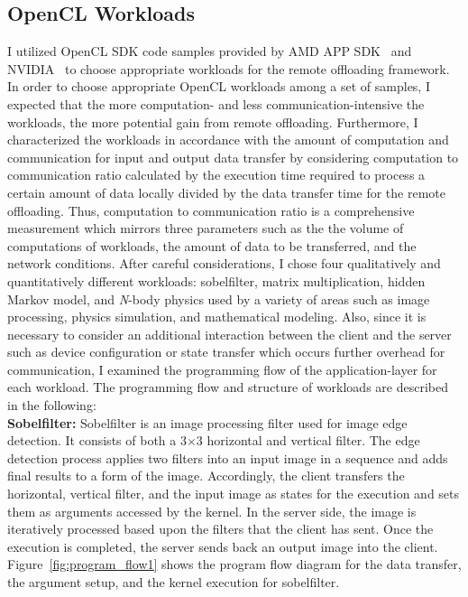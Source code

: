 \subsection{OpenCL Workloads}
\label{character:workloads}
%
I utilized OpenCL SDK code samples provided by AMD APP
SDK~\cite{amd} and NVIDIA~\cite{nvidia} to choose appropriate workloads for
the remote offloading framework.
%
In order to choose appropriate OpenCL workloads among a set of samples,
I expected that the more computation- and less communication-intensive
the workloads, the more potential gain from remote offloading.
%
Furthermore, I characterized the workloads in accordance with the
amount of computation and communication for input and output data
transfer by considering computation to communication ratio
calculated by the execution time required to process a certain amount of
data locally divided by the data transfer time for the remote offloading.
%
Thus, computation to communication ratio is a
comprehensive measurement which mirrors three parameters such as the
the volume of computations of workloads, the amount of data to be transferred, and the
network conditions.
%
After careful considerations, I chose four qualitatively and
quantitatively different workloads: sobelfilter, matrix multiplication,
hidden Markov model, and {\it N}-body physics used by a variety of areas such as
image processing, physics simulation, and mathematical modeling.
%
Also, since it is necessary to consider an additional interaction 
between the client and the server such as device configuration 
or state transfer which occurs further overhead for communication, 
I examined the programming flow of the application-layer for each workload.
%
The programming flow and structure of workloads are described in the following:\\
%
{\bf Sobelfilter:} Sobelfilter is an image processing filter used for
image edge detection.
%
It consists of both a 3$\times$3 horizontal and vertical filter.
%
The edge detection process applies two filters into an input image in a
sequence and adds final results to a form of the image.
%
Accordingly, the client transfers the horizontal, vertical filter, and
the input image as states for the execution and sets them as arguments
accessed by the kernel.
%
In the server side, the image is iteratively processed based upon the
filters that the client has sent.
%
Once the execution is completed, the server sends back an output image
into the client.
%
Figure~\ref{fig:program_flow1} shows the program flow diagram for the data transfer, the argument
setup, and the kernel execution for sobelfilter.\\
